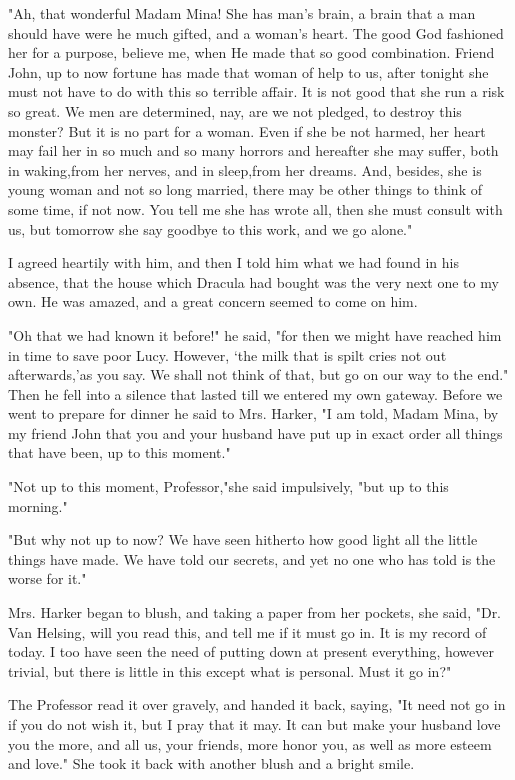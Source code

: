 "Ah, that wonderful Madam Mina! She has man's brain, a brain that a man should have were he much gifted, and a woman's heart. The good God fashioned her for a purpose, believe me, when He made that so good combination. Friend John, up to now fortune has made that woman of help to us, after tonight she must not have to do with this so terrible affair. It is not good that she run a risk so great. We men are determined, nay, are we not pledged, to destroy this monster? But it is no part for a woman. Even if she be not harmed, her heart may fail her in so much and so many horrors and hereafter she may suffer, both in waking,from her nerves, and in sleep,from her dreams. And, besides, she is young woman and not so long married, there may be other things to think of some time, if not now. You tell me she has wrote all, then she must consult with us, but tomorrow she say goodbye to this work, and we go alone." 

I agreed heartily with him, and then I told him what we had found in his absence, that the house which Dracula had bought was the very next one to my own. He was amazed, and a great concern seemed to come on him. 

"Oh that we had known it before!" he said, "for then we might have reached him in time to save poor Lucy. However, `the milk that is spilt cries not out afterwards,'as you say. We shall not think of that, but go on our way to the end." Then he fell into a silence that lasted till we entered my own gateway. Before we went to prepare for dinner he said to Mrs. Harker, "I am told, Madam Mina, by my friend John that you and your husband have put up in exact order all things that have been, up to this moment." 

"Not up to this moment, Professor,"she said impulsively, "but up to this morning." 

"But why not up to now? We have seen hitherto how good light all the little things have made. We have told our secrets, and yet no one who has told is the worse for it." 

Mrs. Harker began to blush, and taking a paper from her pockets, she said, "Dr. Van Helsing, will you read this, and tell me if it must go in. It is my record of today. I too have seen the need of putting down at present everything, however trivial, but there is little in this except what is personal. Must it go in?" 

The Professor read it over gravely, and handed it back, saying, "It need not go in if you do not wish it, but I pray that it may. It can but make your husband love you the more, and all us, your friends, more honor you, as well as more esteem and love." She took it back with another blush and a bright smile. 


